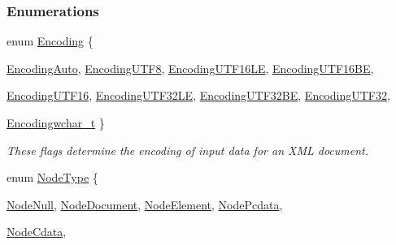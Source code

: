 \subsubsection*{Enumerations}
\begin{DoxyCompactItemize}
\item 
enum \hyperlink{namespacephys_1_1xml_a420f5de782438f88160321385bea2015}{Encoding} \{ \par
\hyperlink{namespacephys_1_1xml_a420f5de782438f88160321385bea2015a2792ef334e1061e7ad177df463256d85}{EncodingAuto}, 
\hyperlink{namespacephys_1_1xml_a420f5de782438f88160321385bea2015a7793b4cde174342c9450abbeab675743}{EncodingUTF8}, 
\hyperlink{namespacephys_1_1xml_a420f5de782438f88160321385bea2015aa5e6a756e80683f376d1ef0a03b21d56}{EncodingUTF16LE}, 
\hyperlink{namespacephys_1_1xml_a420f5de782438f88160321385bea2015a04fd7b1fef8d2dcc67a46b8fe4dbcaf4}{EncodingUTF16BE}, 
\par
\hyperlink{namespacephys_1_1xml_a420f5de782438f88160321385bea2015ac19070aaf7044426b0fe8fa5af956130}{EncodingUTF16}, 
\hyperlink{namespacephys_1_1xml_a420f5de782438f88160321385bea2015a127752883aaf8c9bdb5f66ec725211fc}{EncodingUTF32LE}, 
\hyperlink{namespacephys_1_1xml_a420f5de782438f88160321385bea2015a5fb13deaf1552b0f4c00e2b8cafce0b9}{EncodingUTF32BE}, 
\hyperlink{namespacephys_1_1xml_a420f5de782438f88160321385bea2015ac61c2f632bd66c2466c29783beb33f8a}{EncodingUTF32}, 
\par
\hyperlink{namespacephys_1_1xml_a420f5de782438f88160321385bea2015a2bc9c8d42796901c8feaa25e17c56cef}{Encodingwchar\_\-t}
 \}
\begin{DoxyCompactList}\small\item\em These flags determine the encoding of input data for an XML document. \item\end{DoxyCompactList}\item 
enum \hyperlink{namespacephys_1_1xml_a668b0cc666a9d49f7c7222a7552115d3}{NodeType} \{ \par
\hyperlink{namespacephys_1_1xml_a668b0cc666a9d49f7c7222a7552115d3af6e95d4a0b6115c76b339961bc58d742}{NodeNull}, 
\hyperlink{namespacephys_1_1xml_a668b0cc666a9d49f7c7222a7552115d3acfe92e6bd275972917b95f08bd46e09f}{NodeDocument}, 
\hyperlink{namespacephys_1_1xml_a668b0cc666a9d49f7c7222a7552115d3a92facb9678134df6404ce63e7e48624c}{NodeElement}, 
\hyperlink{namespacephys_1_1xml_a668b0cc666a9d49f7c7222a7552115d3ab48d4b88d7a7757e3e8505c90db3b2bf}{NodePcdata}, 
\par
\hyperlink{namespacephys_1_1xml_a668b0cc666a9d49f7c7222a7552115d3a353968e806a751a6da4f7ac115b4ab55}{NodeCdata}, 

\end{DoxyCompactItemize}
